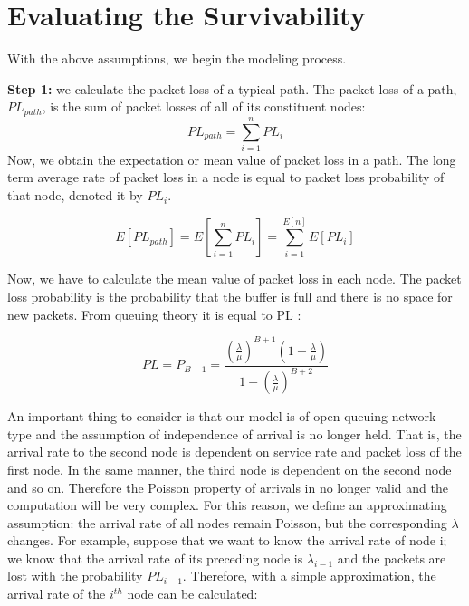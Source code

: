 \documentclass[conference]{IEEEtran}
\begin{document}
    \section{Evaluating the Survivability} \label{sec:eval}
    With the above assumptions, we begin the modeling process.

    \textbf{Step 1:} we calculate the packet loss of a typical path. The packet loss of a path, $PL_{path}$, is the sum of packet losses of all of its constituent nodes:
    \begin{equation}
        PL_{path}=\sum_{i=1}^nPL_i
    \end{equation}
    Now, we obtain the expectation or mean value of packet loss in a path. The long term average rate of packet loss in a node is equal to packet loss probability of that node, denoted it by $PL_i$.

    \begin{equation}
        E\left[PL_{path}\right]=E\left[\sum_{i=1}^nPL_i\right]=\sum_{i=1}^{E\left[n\right]}E\left[PL_i\right]
    \end{equation}

    Now, we have to calculate the mean value of packet loss in each node. The packet loss probability is the probability that the buffer is full and there is no space for new packets. From queuing theory it is equal to PL \cite{b4}:

    \begin{equation}
        PL=P_{B+1}=\frac{{\left(\frac{\lambda}{\mu}\right)^{B+1}}{\left(1-\frac{\lambda}{\mu}\right)} }
        {{1-\left(\frac{\lambda}{\mu}\right)}^{B+2}}
    \end{equation}

    An important thing to consider is that our model is of open queuing network type and the assumption of independence of arrival is no longer held. That is, the arrival rate to the second node is dependent on service rate and packet loss of the first node. In the same manner, the third node is dependent on the second node and so on. Therefore the Poisson property of arrivals in no longer valid and the computation will be very complex. For this reason, we define an approximating assumption: the arrival rate of all nodes remain Poisson, but the corresponding $\lambda$ changes. For example, suppose that we want to know the arrival rate of node i; we know that the arrival rate of its preceding node is $\lambda_{i-1}$ and the packets are lost with the probability $PL_{i-1}$. Therefore, with a simple approximation, the arrival rate of the $i^{th}$ node can be calculated:
\end{document}
